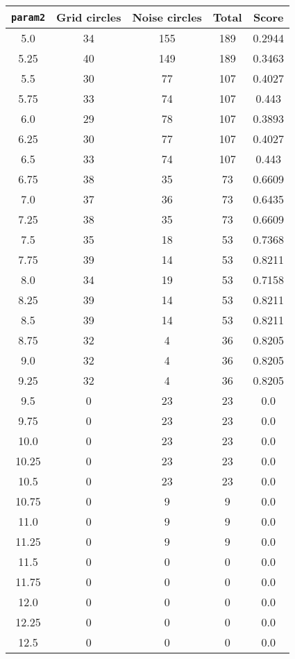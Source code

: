 \documentclass[letterpaper, 12pt]{article}
\begin{document}
\begin{longtable}{|c|c|c|c|c|}
\hline
\textbf{\texttt{param2}} & \textbf{Grid circles} & \textbf{Noise circles} & \textbf{Total} & \textbf{Score} \\
\hline
5.0 & 34 & 155 & 189 & 0.2944 \\
\hline
5.25 & 40 & 149 & 189 & 0.3463 \\
\hline
5.5 & 30 & 77 & 107 & 0.4027 \\
\hline
5.75 & 33 & 74 & 107 & 0.443 \\
\hline
6.0 & 29 & 78 & 107 & 0.3893 \\
\hline
6.25 & 30 & 77 & 107 & 0.4027 \\
\hline
6.5 & 33 & 74 & 107 & 0.443 \\
\hline
6.75 & 38 & 35 & 73 & 0.6609 \\
\hline
7.0 & 37 & 36 & 73 & 0.6435 \\
\hline
7.25 & 38 & 35 & 73 & 0.6609 \\
\hline
7.5 & 35 & 18 & 53 & 0.7368 \\
\hline
7.75 & 39 & 14 & 53 & 0.8211 \\
\hline
8.0 & 34 & 19 & 53 & 0.7158 \\
\hline
8.25 & 39 & 14 & 53 & 0.8211 \\
\hline
8.5 & 39 & 14 & 53 & 0.8211 \\
\hline
8.75 & 32 & 4 & 36 & 0.8205 \\
\hline
9.0 & 32 & 4 & 36 & 0.8205 \\
\hline
9.25 & 32 & 4 & 36 & 0.8205 \\
\hline
9.5 & 0 & 23 & 23 & 0.0 \\
\hline
9.75 & 0 & 23 & 23 & 0.0 \\
\hline
10.0 & 0 & 23 & 23 & 0.0 \\
\hline
10.25 & 0 & 23 & 23 & 0.0 \\
\hline
10.5 & 0 & 23 & 23 & 0.0 \\
\hline
10.75 & 0 & 9 & 9 & 0.0 \\
\hline
11.0 & 0 & 9 & 9 & 0.0 \\
\hline
11.25 & 0 & 9 & 9 & 0.0 \\
\hline
11.5 & 0 & 0 & 0 & 0.0 \\
\hline
11.75 & 0 & 0 & 0 & 0.0 \\
\hline
12.0 & 0 & 0 & 0 & 0.0 \\
\hline
12.25 & 0 & 0 & 0 & 0.0 \\
\hline
12.5 & 0 & 0 & 0 & 0.0 \\

\end{longtable}
\end{document}
